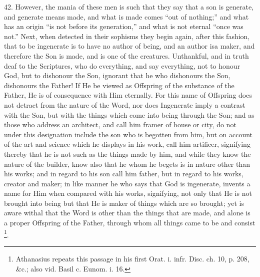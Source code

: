 42. However, the mania of
these men is such that they say that a son is generate, and generate
means made, and what is made comes ``out of nothing;'' and what has an
origin ``is not before its generation,'' and what is not eternal ``once
was not.'' Next, when detected in their sophisms they begin again,
after this fashion, that to be ingenerate is to have no author of
being, and an author is\emph{}a maker, and therefore the Son is made,
and is one of the creatures. Unthankful, and in truth deaf to the
Scriptures, who do everything, and say everything, not to honour God,
but to dishonour the Son, ignorant that he who dishonours the Son,
dishonours the Father! If He be viewed as Offspring of the substance
of the Father, He is of consequence with Him eternally. For this name
of Offspring does not detract from the nature of the Word, nor does
Ingenerate imply a contrast with the Son, but with the things which
come into being through the Son; and as those who address an
architect, and call him framer of house or city, do not under this
designation include the son who is begotten from him, but on account
of the art and science which he displays in his work, call him
artificer, signifying thereby that he is not such as the things made
by him, and while they know the nature of the builder, know also that
he whom he begets is in nature other than his works; and in regard to
his son call him father, but in regard to his works, creator and
maker; in like manner he who says that God is ingenerate, invents a
name for Him when compared with his works, signifying, not only that
He is not brought into being but that He is maker of things which are
so brought; yet is aware withal that the Word is other than the things
that are made, and alone is a proper Offspring of the Father,
through whom all things came to be and consist \footnote{Athanasius repeats this passage in his first Orat. i. infr. Disc. ch. 10, p.
208, \&c.; also vid. Basil c. Eunom. i. 16.}.

